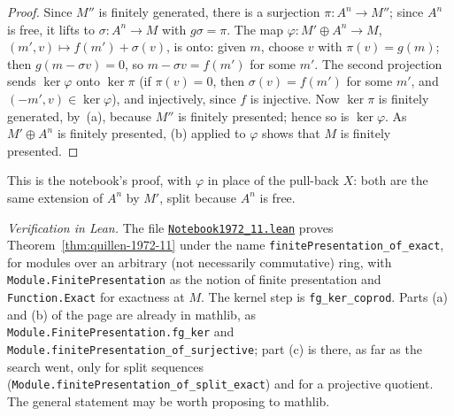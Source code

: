 \begin{proof}
Since $M''$ is finitely generated, there is a surjection $\pi \colon A^n \to M''$; since $A^n$ is free, it lifts to $\sigma \colon A^n \to M$ with $g\sigma = \pi$. The map $\varphi \colon M' \oplus A^n \to M$, $(m', v) \mapsto f(m') + \sigma(v)$, is onto: given $m$, choose $v$ with $\pi(v) = g(m)$; then $g(m - \sigma v) = 0$, so $m - \sigma v = f(m')$ for some $m'$. The second projection sends $\ker\varphi$ onto $\ker\pi$ (if $\pi(v) = 0$, then $\sigma(v) = f(m')$ for some $m'$, and $(-m', v) \in \ker\varphi$), and injectively, since $f$ is injective. Now $\ker\pi$ is finitely generated, by~(a), because $M''$ is finitely presented; hence so is $\ker\varphi$. As $M' \oplus A^n$ is finitely presented, (b) applied to $\varphi$ shows that $M$ is finitely presented.
\end{proof}

\noindent This is the notebook's proof, with $\varphi$ in place of the pull-back $X$: both are the same extension of $A^n$ by $M'$, split because $A^n$ is free.

\emph{Verification in Lean.} The file \href{\leanblobmain/Notebook1972_11.lean}{\texttt{Notebook1972\_11.\allowbreak{}lean}} proves Theorem~\ref{thm:quillen-1972-11} under the name \texttt{finitePresentation\_of\_exact}, for modules over an arbitrary (not necessarily commutative) ring, with \texttt{Module.FinitePresentation} as the notion of finite presentation and \texttt{Function.Exact} for exactness at $M$. The kernel step is \texttt{fg\_ker\_coprod}. Parts (a) and (b) of the page are already in mathlib, as \texttt{Module.FinitePresentation.fg\_ker} and \texttt{Module.finitePresentation\_of\_surjective}; part (c) is there, as far as the search went, only for split sequences (\texttt{Module.finitePresentation\_of\_split\_exact}) and for a projective quotient. The general statement may be worth proposing to mathlib.

